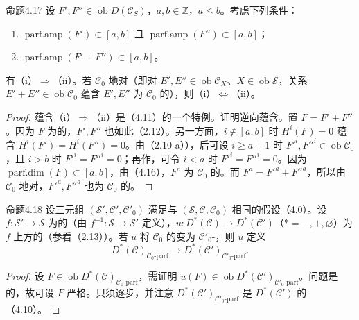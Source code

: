 \begin{SGAresult}{命题}{4.17}
设 $F',F''\in\operatorname{ob}D(\mathcal C_S)$，$a,b\in\mathbb Z$，$a\leq b$。考虑下列条件：
\begin{enumerate}
\item[(i)] $\operatorname{parf.amp}(F')\subset[a,b]$ 且 $\operatorname{parf.amp}(F'')\subset[a,b]$；
\item[(ii)] $\operatorname{parf.amp}(F'+F'')\subset[a,b]$。
\end{enumerate}
有（i）$\Rightarrow$（ii）。若 $\mathcal C_0$ 地对（即对 $E',E''\in\operatorname{ob}\mathcal C_X$、$X\in\operatorname{ob}\mathscr S$，关系 $E'+E''\in\operatorname{ob}\mathcal C_0$ 蕴含 $E',E''$ 为 $\mathcal C_0$ 的），则（i）$\Leftrightarrow$（ii）。
\end{SGAresult}
\begin{proof}
蕴含（i）$\Rightarrow$（ii）是（4.11）的一个特例。证明逆向蕴含。置 $F=F'+F''$。因为 $F$ 为的，$F',F''$ 也如此（2.12）。另一方面，$i\notin[a,b]$ 时 $H^i(F)=0$ 蕴含 $H^i(F')=H^i(F'')=0$。由（2.10 a）），后可设 $i\geq a+1$ 时 $F'^i,F''^i\in\operatorname{ob}\mathcal C_0$，且 $i>b$ 时 $F'^i=F''^i=0$；再作，可令
$i<a$ 时 $F'^i=F''^i=0$。因为 $\operatorname{parf.dim}(F)\subset[a,b]$，由（4.16），$F^a$ 为 $\mathcal C_0$ 的。而 $F^a=F'^a+F''^a$，所以由 $\mathcal C_0$ 地对，$F'^a,F''^a$ 也为 $\mathcal C_0$ 的。
\end{proof}

\begin{SGAresult}{命题}{4.18}
设三元组 $(\mathscr S',\mathcal C',\mathcal C'_0)$ 满足与 $(\mathscr S,\mathcal C,\mathcal C_0)$ 相同的假设（4.0）。设 $f:\mathscr S'\to\mathscr S$ 为的（由 $f^{-1}:\mathscr S\to\mathscr S'$ 定义），$u:D^*(\mathcal C)\to D^*(\mathcal C')$（$*=-,+,\varnothing$）为 $f$ 上方的（参看（2.13））。若 $u$ 将 $\mathcal C_0$ 的变为 $\mathcal C'_0$-，则 $u$ 定义
\[D^*(\mathcal C)_{\mathcal C_0\text{-parf}}\longrightarrow D^*(\mathcal C')_{\mathcal C'_0\text{-parf}}.\]
\end{SGAresult}
\begin{proof}
设 $F\in\operatorname{ob}D^*(\mathcal C)_{\mathcal C_0\text{-parf}}$，需证明 $u(F)\in\operatorname{ob}D^*(\mathcal C')_{\mathcal C'_0\text{-parf}}$。问题是的，故可设 $F$ 严格。只须逐步，并注意 $D^*(\mathcal C')_{\mathcal C'_0\text{-parf}}$ 是 $D^*(\mathcal C')$ 的（4.10）。
\end{proof}

